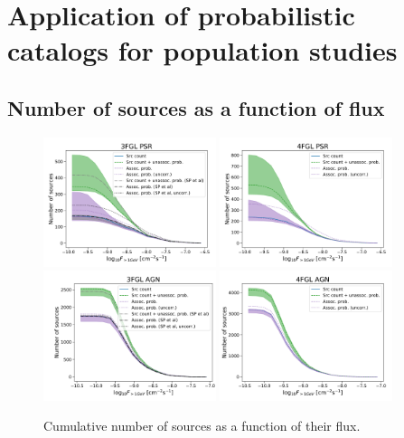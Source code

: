 \section{Application of probabilistic catalogs for population studies}

\subsection{Number of sources as a function of flux}



\begin{figure}[h]
\center
\includegraphics[width=0.45\textwidth]{plots/N_logS_3FGL_PSR_SazP_add_os.pdf}
\includegraphics[width=0.45\textwidth]{plots/N_logS_4FGL_PSR_add_os.pdf} \\
\includegraphics[width=0.45\textwidth]{plots/N_logS_3FGL_AGN_SazP_add_os.pdf}
\includegraphics[width=0.45\textwidth]{plots/N_logS_4FGL_AGN_add_os.pdf}
\caption{Cumulative number of sources as a function of their flux.}  
\label{fig:logN_logS}
\end{figure}


